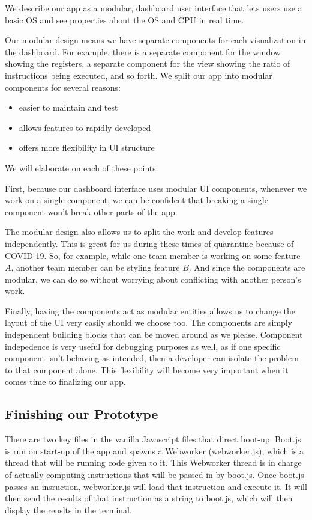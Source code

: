 We describe our app as a modular, dashboard user interface that lets users use a
basic OS and see properties about the OS and CPU in real time.

Our modular design means we have separate components for each visualization in the dashboard.
For example, there is a separate component for the window showing the registers, a separate
component for the view showing the ratio of instructions being executed, and so forth.
We split our app into modular components for several reasons:

\begin{itemize}
  \item easier to maintain and test
  \item allows features to rapidly developed
  \item offers more flexibility in UI structure
\end{itemize}

We will elaborate on each of these points.

First, because our dashboard interface uses modular UI components, whenever we work on a single
component, we can be confident that breaking a single component won't break other parts of the app.

The modular design also allows us to split the work and develop features independently. This is great for
us during these times of quarantine because of COVID-19. So, for example, while one team member is working on some feature
$A$, another team member can be styling feature $B$. And since the components are modular, we can do so without
worrying about conflicting with another person's work.

Finally, having the components act as modular entities allows us to change the layout of the UI very easily should
we choose too. The components are simply independent building blocks that can be moved around as we please.
Component indepedence is very useful for debugging purposes as well, as if one specific component isn't behaving
as intended, then a developer can isolate the problem to that component alone. This
flexibility will become very important when it comes time to finalizing our app.

\subsection*{Finishing our Prototype}

There are two key files in the vanilla Javascript files that direct boot-up. Boot.js is run on start-up
of the app and spawns a Webworker (webworker.js), which is a thread that will be running code given to it. This Webworker
thread is in charge of actually computing instructions that will be passed in by boot.js. Once boot.js
passes an insruction, webworker.js will load that instruction and execute it. It will then send the results of that
instruction as a string to boot.js, which will then display the reuslts in the terminal.

